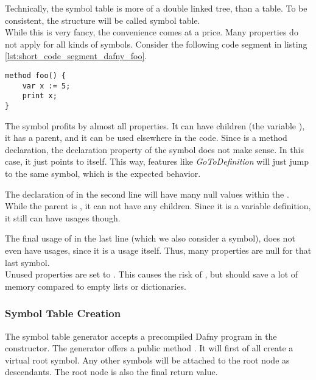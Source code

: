 Technically, the symbol table is more of a double linked tree, than a table.
To be consistent, the structure will be called symbol table.\\

While this is very fancy, the convenience comes at a price.
Many properties do not apply for all kinds of symbols.
Consider the following code segment in listing \ref{lst:short_code_segment_dafny_foo}.

\begin{lstlisting}[language=dafny, caption={Example Code Regarding Symbol Information}, captionpos=b, label={lst:short_code_segment_dafny_foo}]
method foo() {
    var x := 5;
    print x;
}
\end{lstlisting}

The symbol  profits by almost all properties.
It can have children (the variable ), it has a parent, and it can be used elsewhere in the code.
Since  is a method declaration, the declaration property of the symbol does not make sense.
In this case, it just points to itself.
This way, features like \textit{GoToDefinition} will just jump to the same symbol, which is the expected behavior.

The declaration of  in the second line will have many null values within the .
While the parent is , it can not have any children.
Since it is a variable definition, it still can have usages though.

The final usage of  in the last line (which we also consider a symbol), does not even have usages, since it is a usage itself.
Thus, many properties are null for that last symbol.\\

Unused properties are set to .
This causes the risk of , but should save a lot of memory compared to empty lists or dictionaries.\\

\subsubsection{Symbol Table Creation}
The symbol table generator accepts a precompiled Dafny program in the constructor.
The generator offers a public method .
It will first of all create a virtual root symbol.
Any other symbols will be attached to the root node as descendants.
The root node is also the final return value.\\

